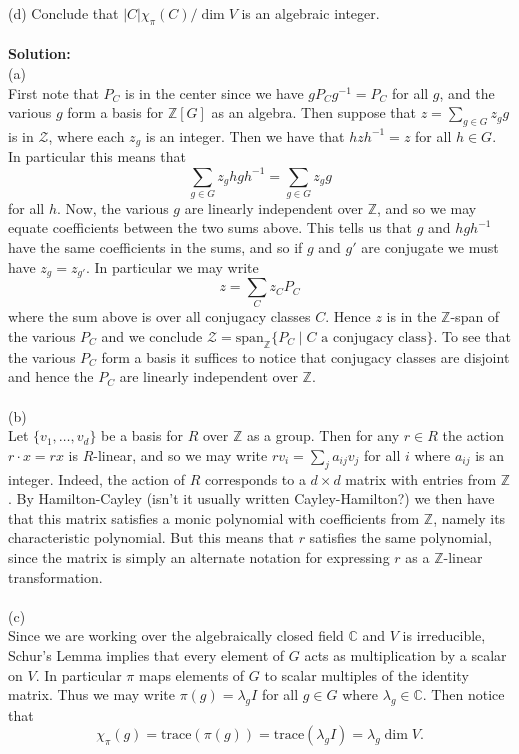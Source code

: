 \documentclass[11pt]{article}
\newcommand{\Z}{\mathbb{Z}}
\newcommand{\C}{\mathbb{C}}
\begin{document}
(d) Conclude that $|C|\chi_\pi(C)/ \dim V$ is an algebraic integer.\\\\
\textbf{Solution:}\\
(a)\\
First note that $P_C$ is in the center since we have $gP_C g^{-1} = P_C$ for all $g$, and the various $g$ form a basis for $\Z[G]$ as an algebra. Then suppose that $z = \sum_{g\in G} z_g g$ is in $\mathcal Z$, where each $z_g$ is an integer. Then we have that $hzh^{-1} = z$ for all $h\in G$. In particular this means that \[
\sum_{g\in G} z_g h gh^{-1} = \sum_{g\in G} z_g g
\]
for all $h$. Now, the various $g$ are linearly independent over $\Z$, and so we may equate coefficients between the two sums above. This tells us that $g$ and $hgh^{-1}$ have the same coefficients in the sums, and so if $g$ and $g'$ are conjugate we must have $z_g = z_{g'}$. In particular we may write \[
z = \sum_{C} z_C P_C
\]
where the sum above is over all conjugacy classes $C$. Hence $z$ is in the $\Z$-span of the various $P_C$ and we conclude $\mathcal Z = \mbox{span}_\Z\{P_C\mid \text{$C$ a conjugacy class} \}$. To see that the various $P_C$ form a basis it suffices to notice that conjugacy classes are disjoint and hence the $P_C$ are linearly independent over $\Z$. \\\\
(b)\\
Let $\{v_1,\ldots, v_d\}$ be a basis for $R$ over $\Z$ as a group. Then for any $r\in R$ the action $r\cdot x = rx$ is $R$-linear, and so we may write $rv_i = \sum_{j}a_{ij} v_j$ for all $i$ where $a_{ij}$ is an integer. Indeed, the action of $R$ corresponds to a $d\times d$ matrix with entries from $\Z$. By Hamilton-Cayley (isn't it usually written Cayley-Hamilton?) we then have that this matrix satisfies a monic polynomial with coefficients from $\Z$, namely its characteristic polynomial. But this means that $r$ satisfies the same polynomial, since the matrix is simply an alternate notation for expressing $r$ as a $\Z$-linear transformation. \\\\
(c)\\
Since we are working over the algebraically closed field $\C$ and $V$ is irreducible, Schur's Lemma implies that every element of $G$ acts as multiplication by a scalar on $V$. In particular $\pi$ maps elements of $G$ to scalar multiples of the identity matrix. Thus we may write $\pi(g) = \lambda_g I$ for all $g\in G$ where $\lambda_g\in \C$. Then notice that \[
\chi_\pi(g) = \mbox{trace}(\pi(g)) = \mbox{trace}(\lambda_g I) = \lambda_g \dim V .
\]
\end{document}

